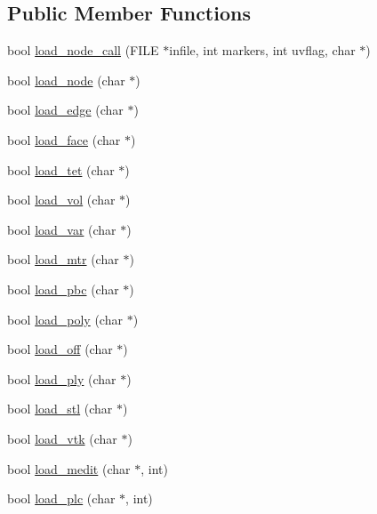 \subsection*{Public Member Functions}
\begin{DoxyCompactItemize}
\item 
bool \hyperlink{classtetgenio_a72c82390f2cf5cc8e82b7e78d3957d97}{load\+\_\+node\+\_\+call} (F\+I\+LE $\ast$infile, int markers, int uvflag, char $\ast$)
\item 
bool \hyperlink{classtetgenio_afeb93fe605c74f7523314fe21b726872}{load\+\_\+node} (char $\ast$)
\item 
bool \hyperlink{classtetgenio_ae57d905901345797047108bc8995382a}{load\+\_\+edge} (char $\ast$)
\item 
bool \hyperlink{classtetgenio_acfd5a05583426d2d50c554e353814b22}{load\+\_\+face} (char $\ast$)
\item 
bool \hyperlink{classtetgenio_afcb7616b65ca87657affbdad0c9dbe0b}{load\+\_\+tet} (char $\ast$)
\item 
bool \hyperlink{classtetgenio_ad2c1a5e053689f1e68c0c849d3ebcd3d}{load\+\_\+vol} (char $\ast$)
\item 
bool \hyperlink{classtetgenio_a42b38e1e09d889f3027225402d888721}{load\+\_\+var} (char $\ast$)
\item 
bool \hyperlink{classtetgenio_a281d6699f746ac5d2b4ca70075be53c7}{load\+\_\+mtr} (char $\ast$)
\item 
bool \hyperlink{classtetgenio_a9c3559e0c61df8bb9d4ccff74af39cc0}{load\+\_\+pbc} (char $\ast$)
\item 
bool \hyperlink{classtetgenio_a88658f64d725eb11ff33e7104e14561b}{load\+\_\+poly} (char $\ast$)
\item 
bool \hyperlink{classtetgenio_a71c8e637cb420c3a87b648405df47abd}{load\+\_\+off} (char $\ast$)
\item 
bool \hyperlink{classtetgenio_a9b2764289916b479bda5f78b7e6189dc}{load\+\_\+ply} (char $\ast$)
\item 
bool \hyperlink{classtetgenio_a90b035937bf1ff57597f7ba8ecf3d21f}{load\+\_\+stl} (char $\ast$)
\item 
bool \hyperlink{classtetgenio_a566bcdee657ea1ca15a64bcb2acd4231}{load\+\_\+vtk} (char $\ast$)
\item 
bool \hyperlink{classtetgenio_a5008aeef714575c2cd9c74da1354b962}{load\+\_\+medit} (char $\ast$, int)
\item 
bool \hyperlink{classtetgenio_ac47582d8d9a09f1d8d32221527a0aa7b}{load\+\_\+plc} (char $\ast$, int)
\item 

\end{DoxyCompactItemize}
